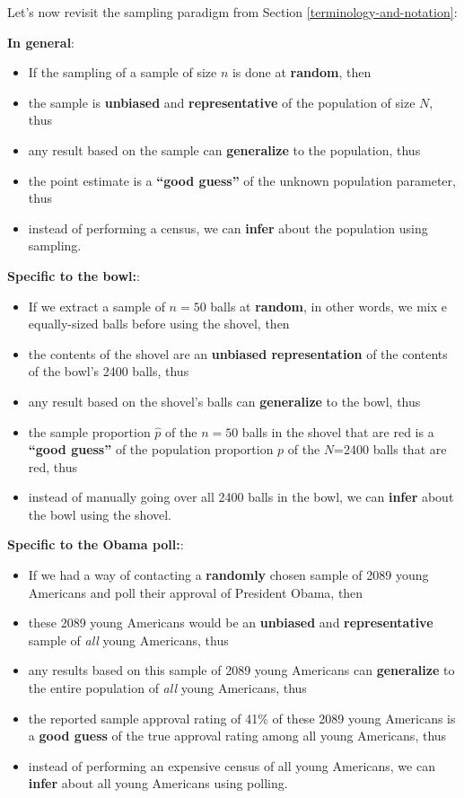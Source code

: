 \documentclass[
]{book}
\providecommand{\tightlist}{%
  \setlength{\itemsep}{0pt}\setlength{\parskip}{0pt}}
\begin{document}
Let's now revisit the sampling paradigm from Section \ref{terminology-and-notation}:

\textbf{In general}:

\begin{itemize}
\tightlist
\item
  If the sampling of a sample of size \(n\) is done at \textbf{random}, then
\item
  the sample is \textbf{unbiased} and \textbf{representative} of the population of size \(N\), thus
\item
  any result based on the sample can \textbf{generalize} to the population, thus
\item
  the point estimate is a \textbf{``good guess''} of the unknown population parameter, thus
\item
  instead of performing a census, we can \textbf{infer} about the population using sampling.
\end{itemize}

\textbf{Specific to the bowl:}:

\begin{itemize}
\tightlist
\item
  If we extract a sample of \(n=50\) balls at \textbf{random}, in other words, we mix e equally-sized balls before using the shovel, then
\item
  the contents of the shovel are an \textbf{unbiased representation} of the contents of the bowl's 2400 balls, thus
\item
  any result based on the shovel's balls can \textbf{generalize} to the bowl, thus
\item
  the sample proportion \(\widehat{p}\) of the \(n=50\) balls in the shovel that are red is a \textbf{``good guess''} of the population proportion \(p\) of the \(N\)=2400 balls that are red, thus
\item
  instead of manually going over all 2400 balls in the bowl, we can \textbf{infer} about the bowl using the shovel.
\end{itemize}

\textbf{Specific to the Obama poll:}:

\begin{itemize}
\tightlist
\item
  If we had a way of contacting a \textbf{randomly} chosen sample of 2089 young Americans and poll their approval of President Obama, then
\item
  these 2089 young Americans would be an \textbf{unbiased} and \textbf{representative} sample of \emph{all} young Americans, thus
\item
  any results based on this sample of 2089 young Americans can \textbf{generalize} to the entire population of \emph{all} young Americans, thus
\item
  the reported sample approval rating of 41\% of these 2089 young Americans is a \textbf{good guess} of the true approval rating among all young Americans, thus
\item
  instead of performing an expensive census of all young Americans, we can \textbf{infer} about all young Americans using polling.
\end{itemize}
\end{document}
